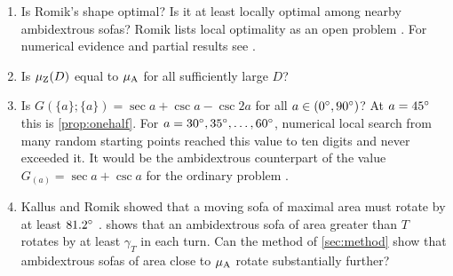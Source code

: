 \begin{enumerate}[label=(\arabic*),leftmargin=*]
\item Is Romik's shape optimal? Is it at least locally optimal among nearby ambidextrous sofas? Romik lists local optimality as an open problem \cite{romik2018}. For numerical evidence and partial results see \cite{mohammed2026,bonfioli2026}.

\item Is $\mu_{\mathrm{Z}}(D)$ equal to $\mu_{\mathrm{A}}$ for all sufficiently large $D$?

\item Is $G(\{a\};\{a\})=\sec a+\csc a-\csc2a$ for all $a\in(0^{\circ},90^{\circ})$? At $a=45^{\circ}$ this is \cref{prop:onehalf}. For $a=30^{\circ},35^{\circ},\dots,60^{\circ}$, numerical local search from many random starting points reached this value to ten digits and never exceeded it. It would be the ambidextrous counterpart of the value $G_{(a)}=\sec a+\csc a$ for the ordinary problem \cite[Section~2]{kallusromik2018}.

\item Kallus and Romik showed that a moving sofa of maximal area must rotate by at least $81.2^{\circ}$ \cite[Theorem~2]{kallusromik2018}.  shows that an ambidextrous sofa of area greater than $T$ rotates by at least $\gamma_T$ in each turn. Can the method of \cref{sec:method} show that ambidextrous sofas of area close to $\mu_{\mathrm{A}}$ rotate substantially further?
\end{enumerate}
